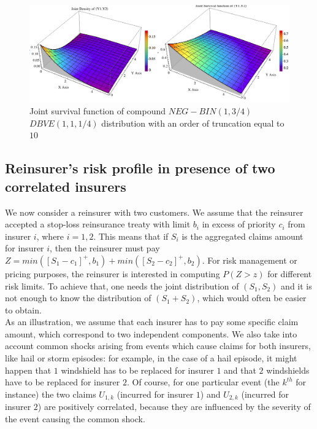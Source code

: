 \begin{center}
	\begin{figure}[h!]
		\begin{center}
			\includegraphics[width=12cm]{Chapitre5/Graph3DPDFSurvivalNegBinGDBVE.png}
			\caption{Joint survival function of compound $NEG-BIN(1,3/4)$ $DBVE(1,1,1/4)$ distribution with an order of truncation equal to $10$}\label{3DPlotNegBinCompoundDBVE}
		\end{center}
	\end{figure}
\end{center}
\subsection{Reinsurer's risk profile in presence of two correlated insurers}
We now consider a reinsurer with two customers. We assume that the reinsurer accepted a stop-loss reinsurance treaty with limit $b_{i}$ in excess of priority $c_{i}$ from insurer $i$, where $i=1,2$. This means that if $S_{i}$ is the aggregated claims amount for insurer $i$, then the reinsurer must pay $Z=min\left(\left[S_{1}-c_{1}\right]^{+},b_{1}\right)+min\left(\left[S_{2}-c_{2}\right]^{+},b_{2}\right)$. For risk management or pricing purposes, the reinsurer is interested in computing $P(Z>z)$ for different risk limits. To achieve that, one needs the joint distribution of $(S_{1},S_{2})$ and it is not enough to know the distribution of $(S_{1}+S_{2})$, which would often be easier to obtain.\\

As an illustration, we assume that each insurer has to pay some specific claim amount, which correspond to two independent components. We also take into account common shocks arising from events which cause claims for both insurers, like hail or storm episodes: for example, in the case of a hail episode, it might happen that $1$ windshield has to be replaced for insurer $1$ and that $2$ windshields have to be replaced for insurer $2$. Of course, for one particular event (the $k^{th}$ for instance) the two claims $U_{1,k}$ (incurred for insurer $1$) and $U_{2,k}$ (incurred for insurer $2$) are positively correlated, because they are influenced by the severity of the event causing the common shock.\\

